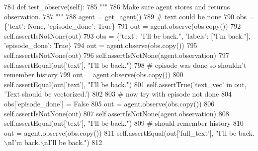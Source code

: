 \begin{DoxyCode}
784     \textcolor{keyword}{def }test\_observe(self):
785         \textcolor{stringliteral}{"""}
786 \textcolor{stringliteral}{        Make sure agent stores and returns observation.}
787 \textcolor{stringliteral}{        """}
788         agent = \hyperlink{namespacetests_1_1test__torch__agent_ae929d109305aaea29fbfa13ecf1f32e9}{get\_agent}()
789         \textcolor{comment}{# text could be none}
790         obs = \{\textcolor{stringliteral}{'text'}: \textcolor{keywordtype}{None}, \textcolor{stringliteral}{'episode\_done'}: \textcolor{keyword}{True}\}
791         out = agent.observe(obs.copy())
792         self.assertIsNotNone(out)
793         obs = \{\textcolor{stringliteral}{'text'}: \textcolor{stringliteral}{"I'll be back."}, \textcolor{stringliteral}{'labels'}: [\textcolor{stringliteral}{"I'm back."}], \textcolor{stringliteral}{'episode\_done'}: \textcolor{keyword}{True}\}
794         out = agent.observe(obs.copy())
795         self.assertIsNotNone(out)
796         self.assertIsNotNone(agent.observation)
797         self.assertEqual(out[\textcolor{stringliteral}{'text'}], \textcolor{stringliteral}{"I'll be back."})
798         \textcolor{comment}{# episode was done so shouldn't remember history}
799         out = agent.observe(obs.copy())
800         self.assertEqual(out[\textcolor{stringliteral}{'text'}], \textcolor{stringliteral}{"I'll be back."})
801         self.assertTrue(\textcolor{stringliteral}{'text\_vec'} \textcolor{keywordflow}{in} out, \textcolor{stringliteral}{'Text should be vectorized.'})
802 
803         \textcolor{comment}{# now try with episode not done}
804         obs[\textcolor{stringliteral}{'episode\_done'}] = \textcolor{keyword}{False}
805         out = agent.observe(obs.copy())
806         self.assertIsNotNone(out)
807         self.assertIsNotNone(agent.observation)
808         self.assertEqual(out[\textcolor{stringliteral}{'text'}], \textcolor{stringliteral}{"I'll be back."})
809         \textcolor{comment}{# should remember history}
810         out = agent.observe(obs.copy())
811         self.assertEqual(out[\textcolor{stringliteral}{'full\_text'}], \textcolor{stringliteral}{"I'll be back.\(\backslash\)nI'm back.\(\backslash\)nI'll be back."})
812 
\end{DoxyCode}
\mbox{\label{classtests_1_1test__torch__agent_1_1TestTorchAgent_a7135ee3421b1d0fc98f0202718910482}} 
